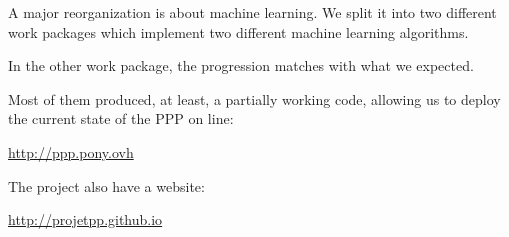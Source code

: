 A major reorganization is about machine learning. We split it into two different work packages which implement two different machine learning algorithms.

In the other work package, the progression matches with what we expected.

Most of them produced, at least, a partially working code, allowing us to deploy the current state of the PPP on line:

\begin{center}
    \url{http://ppp.pony.ovh}
\end{center}

The project also have a website:

\begin{center}
    \url{http://projetpp.github.io}
\end{center}
